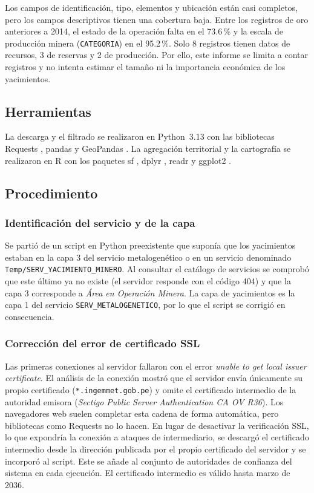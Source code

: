 \documentclass[man,12pt,a4paper,floatsintext,donotrepeattitle]{apa7}
\begin{document}
Los campos de identificación, tipo, elementos y ubicación están casi completos,
pero los campos descriptivos tienen una cobertura baja. Entre los registros de
oro anteriores a 2014, el estado de la operación falta en el 73.6\,\% y la
escala de producción minera (\texttt{CATEGORIA}) en el 95.2\,\%. Solo 8
registros tienen datos de recursos, 3 de reservas y 2 de producción. Por ello, este informe se limita a
contar registros y no intenta estimar el tamaño ni la importancia económica de
los yacimientos.

\subsection{Herramientas}

La descarga y el filtrado se realizaron en Python~3.13 con las bibliotecas
Requests \parencite{requests}, pandas \parencite{mckinney2010} y GeoPandas
\parencite{geopandas}. La agregación territorial y la cartografía se realizaron
en R \parencite{rcore2024} con los paquetes sf \parencite{pebesma2018}, dplyr
\parencite{dplyr}, readr \parencite{readr} y ggplot2 \parencite{wickham2016}.

\subsection{Procedimiento}

\subsubsection{Identificación del servicio y de la capa}

Se partió de un script en Python preexistente que suponía que los yacimientos
estaban en la capa 3 del servicio metalogenético o en un servicio denominado
\texttt{Temp/SERV\_YACIMIENTO\_MINERO}. Al consultar el catálogo de servicios se
comprobó que este último ya no existe (el servidor responde con el código 404) y
que la capa 3 corresponde a \textit{Área en Operación Minera}. La capa de
yacimientos es la capa 1 del servicio \texttt{SERV\_METALOGENETICO}, por lo que
el script se corrigió en consecuencia.

\subsubsection{Corrección del error de certificado SSL}

Las primeras conexiones al servidor fallaron con el error
\textit{unable to get local issuer certificate}. El análisis de la conexión
mostró que el servidor envía únicamente su propio certificado
(\texttt{*.ingemmet.gob.pe}) y omite el certificado intermedio de la autoridad
emisora (\textit{Sectigo Public Server Authentication CA OV R36}). Los
navegadores web suelen completar esta cadena de forma automática, pero bibliotecas
como Requests no lo hacen. En lugar de desactivar la verificación SSL, lo que
expondría la conexión a ataques de intermediario, se descargó el certificado
intermedio desde la dirección publicada por el propio certificado del servidor y
se incorporó al script. Este se añade al conjunto de autoridades de confianza del
sistema en cada ejecución. El certificado intermedio es válido hasta marzo de
2036.
\end{document}
